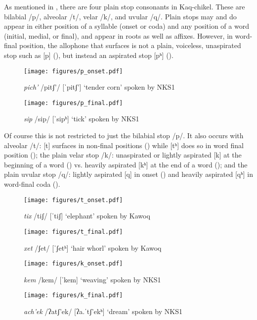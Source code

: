 \documentclass[output=paper,colorlinks,citecolor=brown]{langscibook}
\begin{document}
As mentioned in , there are four plain stop consonants in Kaq-chikel. These are bilabial /p/, alveolar /t/, velar /k/, and uvular /q/. Plain stops may and do appear in either position of a syllable (onset or coda) and any position of a word (initial, medial, or final), and appear in roots as well as affixes. However, in word-final position, the allophone that surfaces is not a plain, voiceless, unaspirated stop such as [p] (), but instead an aspirated stop [pʰ] ().

\begin{figure}
\texttt{[image: figures/p\_onset.pdf]}
\caption{\emph{pich’} /pitʃ’/ [ˈpitʃ’] ‘tender corn’ spoken by NKS1}
\label{p_onset}
\end{figure}

\begin{figure}
\texttt{[image: figures/p\_final.pdf]}
\caption{\emph{sip} /sip/ [ˈsipʰ] ‘tick’ spoken by NKS1}
\label{p_final}
\end{figure}

Of course this is not restricted to just the bilabial stop /p/. It also occurs with alveolar /t/: [t] surfaces in non-final positions () while [tʰ] does so in word final position (); the plain velar stop /k/: unaspirated or lightly aspirated [k] at the beginning of a word () vs. heavily aspirated [kʰ] at the end of a word (); and the plain uvular stop /q/: lightly aspirated [q] in onset () and heavily aspirated [qʰ] in word-final coda ().

\begin{figure}
\texttt{[image: figures/t\_onset.pdf]}
\caption{\emph{tix} /tiʃ/ [ˈtiʃ] ‘elephant’ spoken by Kawoq}
\label{t_onset}
\end{figure}

\begin{figure}
\texttt{[image: figures/t\_final.pdf]}
\caption{ \emph{xet} /ʃet/ [ˈʃetʰ] ‘hair whorl’ spoken by Kawoq}
\label{t_final}
\end{figure}


\begin{figure}
\texttt{[image: figures/k\_onset.pdf]}
\caption{ \emph{kem} /kem/ [ˈkem] ‘weaving’ spoken by NKS1}
\label{k_onset}
\end{figure}

\begin{figure}
\texttt{[image: figures/k\_final.pdf]}
\caption{ \emph{ach’ek} /ʔatʃ’ek/ [ʔa.ˈtʃ’ekʰ] ‘dream’ spoken by NKS1}
\label{k_final}
\end{figure}
\end{document}
